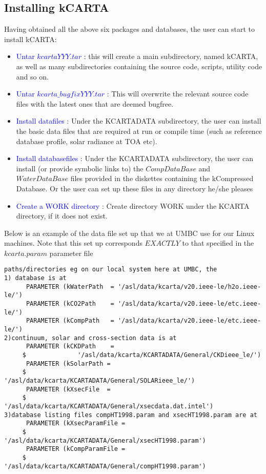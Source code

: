 \documentclass[11pt]{article}
\newcommand{\kc}{\textsf{kCARTA}\xspace}
\begin{document}
\subsection{Installing \kc}
Having obtained all the above six packages and databases, the user can 
start to install \kc :
\begin{itemize}
\item \textcolor{blue} {Untar $kcartaYYY.tar$} :  this will create a main 
subdirectory, named \kc, as well as many subdirectories containing the 
source code, scripts, utility code and so on.
\item \textcolor{blue} {Untar $kcarta\_bugfixYYY.tar$} :  This will 
overwrite the relevant source code files with the latest ones that are 
deemed bugfree. 
\item \textcolor{blue} {Install datafiles} : Under the KCARTADATA 
subdirectory, the user can install the basic data files that are required at
run or compile time (such as reference database profile, solar radiance at 
TOA etc).
\item \textcolor{blue} {Install databasefiles} : Under the KCARTADATA
subdirectory, the user can install (or provide symbolic links to) the 
$CompDataBase$ and $WaterDataBase$ files provided in the diskettes 
containing the kCompressed Database. Or the user can set up these files in
any directory he/she pleases
\item \textcolor{blue} {Create a WORK directory} : Create directory WORK
under the KCARTA directory, if it does not exist.
\end{itemize}

Below is an example of the data file set up that we at UMBC use for our Linux 
machines. Note that this set up corresponds $EXACTLY$ to that specified in the
$kcarta.param$ parameter file
\begin{verbatim}
paths/directories eg on our local system here at UMBC, the 
1) database is at 
      PARAMETER (kWaterPath  = '/asl/data/kcarta/v20.ieee-le/h2o.ieee-le/')
      PARAMETER (kCO2Path    = '/asl/data/kcarta/v20.ieee-le/etc.ieee-le/')
      PARAMETER (kCompPath   = '/asl/data/kcarta/v20.ieee-le/etc.ieee-le/')
2)continuum, solar and cross-section data is at
      PARAMETER (kCKDPath    = 
     $              '/asl/data/kcarta/KCARTADATA/General/CKDieee_le/')
      PARAMETER (kSolarPath = 
     $              '/asl/data/kcarta/KCARTADATA/General/SOLARieee_le/')
      PARAMETER (kXsecFile  = 
     $              '/asl/data/kcarta/KCARTADATA/General/xsecdata.dat.intel')
3)database listing files compHT1998.param and xsecHT1998.param are at
      PARAMETER (kXsecParamFile = 
     $              '/asl/data/kcarta/KCARTADATA/General/xsecHT1998.param')
      PARAMETER (kCompParamFile = 
     $              '/asl/data/kcarta/KCARTADATA/General/compHT1998.param')

\end{verbatim}
\end{document}
